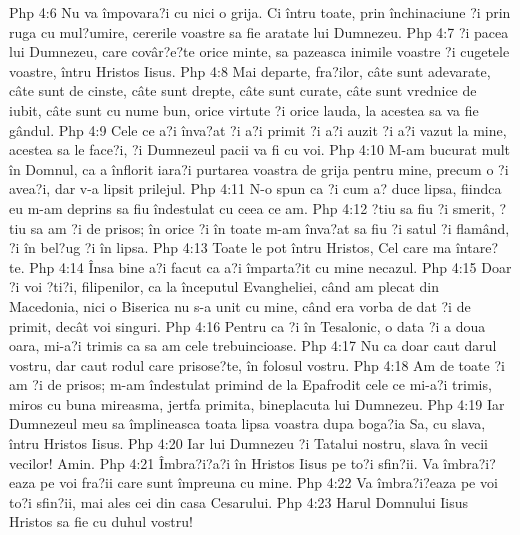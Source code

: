 Php 4:6  Nu va împovara?i cu nici o grija. Ci întru toate, prin închinaciune ?i prin ruga cu mul?umire, cererile voastre sa fie aratate lui Dumnezeu.
Php 4:7  ?i pacea lui Dumnezeu, care covâr?e?te orice minte, sa pazeasca inimile voastre ?i cugetele voastre, întru Hristos Iisus.
Php 4:8  Mai departe, fra?ilor, câte sunt adevarate, câte sunt de cinste, câte sunt drepte, câte sunt curate, câte sunt vrednice de iubit, câte sunt cu nume bun, orice virtute ?i orice lauda, la acestea sa va fie gândul.
Php 4:9  Cele ce a?i înva?at ?i a?i primit ?i a?i auzit ?i a?i vazut la mine, acestea sa le face?i, ?i Dumnezeul pacii va fi cu voi.
Php 4:10  M-am bucurat mult în Domnul, ca a înflorit iara?i purtarea voastra de grija pentru mine, precum o ?i avea?i, dar v-a lipsit prilejul.
Php 4:11  N-o spun ca ?i cum a? duce lipsa, fiindca eu m-am deprins sa fiu îndestulat cu ceea ce am.
Php 4:12  ?tiu sa fiu ?i smerit, ?tiu sa am ?i de prisos; în orice ?i în toate m-am înva?at sa fiu ?i satul ?i flamând, ?i în bel?ug ?i în lipsa.
Php 4:13  Toate le pot întru Hristos, Cel care ma întare?te.
Php 4:14  Însa bine a?i facut ca a?i împarta?it cu mine necazul.
Php 4:15  Doar ?i voi ?ti?i, filipenilor, ca la începutul Evangheliei, când am plecat din Macedonia, nici o Biserica nu s-a unit cu mine, când era vorba de dat ?i de primit, decât voi singuri.
Php 4:16  Pentru ca ?i în Tesalonic, o data ?i a doua oara, mi-a?i trimis ca sa am cele trebuincioase.
Php 4:17  Nu ca doar caut darul vostru, dar caut rodul care prisose?te, în folosul vostru.
Php 4:18  Am de toate ?i am ?i de prisos; m-am îndestulat primind de la Epafrodit cele ce mi-a?i trimis, miros cu buna mireasma, jertfa primita, bineplacuta lui Dumnezeu.
Php 4:19  Iar Dumnezeul meu sa împlineasca toata lipsa voastra dupa boga?ia Sa, cu slava, întru Hristos Iisus.
Php 4:20  Iar lui Dumnezeu ?i Tatalui nostru, slava în vecii vecilor! Amin.
Php 4:21  Îmbra?i?a?i în Hristos Iisus pe to?i sfin?ii. Va îmbra?i?eaza pe voi fra?ii care sunt împreuna cu mine.
Php 4:22  Va îmbra?i?eaza pe voi to?i sfin?ii, mai ales cei din casa Cesarului.
Php 4:23  Harul Domnului Iisus Hristos sa fie cu duhul vostru!


